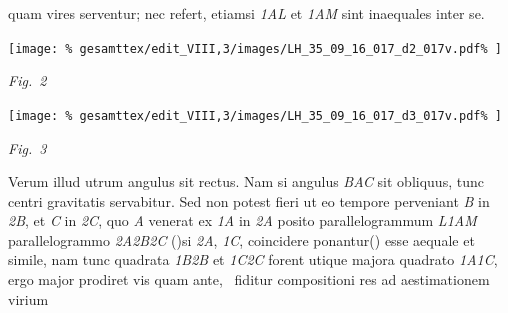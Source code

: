 %
 quam vires serventur; nec refert, etiamsi
\textit{{\scriptsize1}AL}
et \textit{{\scriptsize1}AM}
sint inaequales inter se.
\pend
%
\vspace{2.0em} %
\centerline{%
\texttt{[image: \%
gesamttex/edit\_VIII,3/images/LH\_35\_09\_16\_017\_d2\_017v.pdf\%
]}} 
\vspace{0.5em}
\centerline{%
\lbrack\textit{Fig.~2}\rbrack%
}
\vspace{1.5em}
%
\centerline{%
\texttt{[image: \%
gesamttex/edit\_VIII,3/images/LH\_35\_09\_16\_017\_d3\_017v.pdf\%
]}} 
\vspace{0.5em}
\centerline{%
\lbrack\textit{Fig.~3}\rbrack%
}
%
\pstartfirst
Verum illud 
%
%
utrum angulus sit rectus.\protect{} Nam si angulus \textit{BAC} sit obliquus,%
\protect{}
%
tunc 
%
centri gravitatis%
\protect{}
%
 servabitur. Sed non potest fieri ut eo tempore perveniant \textit{B} in \textit{{\scriptsize2}B}, et \textit{C} in \textit{{\scriptsize2}C},
%
quo \textit{A} venerat ex \textit{{\scriptsize1}A} in \textit{{\scriptsize2}A} posito parallelogrammum%
\protect{} \textit{L{\scriptsize1}AM}
%
parallelogrammo \textit{{\scriptsize 2}A{\scriptsize 2}B{\scriptsize 2}C}
%
(\phantom)\hspace*{-1.2mm}si \textit{{\scriptsize 2}A}, \textit{{\scriptsize 1}C}, 
coincidere ponantur\phantom(\hspace*{-1.2mm})
%
esse aequale et simile, nam tunc quadrata \textit{{\scriptsize1}B{\scriptsize2}B} et  \textit{{\scriptsize1}C{\scriptsize2}C}
%
forent utique majora quadrato \textit{{\scriptsize1}A{\scriptsize1}C}, ergo major prodiret vis\protect{}
%
quam ante\lbrack,\rbrack\
% 
%
fiditur compositioni
%
%
res ad aestimationem virium%
\protect{}
